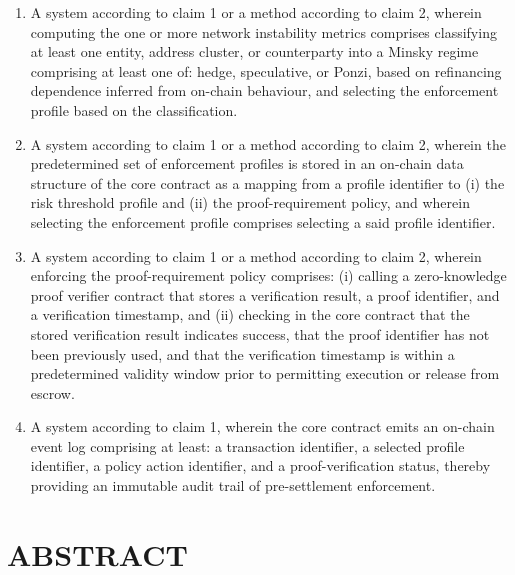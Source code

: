 \documentclass[12pt,a4paper]{article}
\begin{document}
\begin{enumerate}[label=\textbf{\arabic*.}]
\item A system according to claim 1 or a method according to claim 2,
wherein computing the one or more network instability metrics comprises
classifying at least one entity, address cluster, or counterparty into a
Minsky regime comprising at least one of: hedge, speculative, or Ponzi,
based on refinancing dependence inferred from on-chain behaviour, and
selecting the enforcement profile based on the classification.

\item A system according to claim 1 or a method according to claim 2,
wherein the predetermined set of enforcement profiles is stored in an
on-chain data structure of the core contract as a mapping from a profile
identifier to (i) the risk threshold profile and (ii) the proof-requirement
policy, and wherein selecting the enforcement profile comprises selecting a
said profile identifier.

\item A system according to claim 1 or a method according to claim 2,
wherein enforcing the proof-requirement policy comprises: (i) calling a
zero-knowledge proof verifier contract that stores a verification result, a
proof identifier, and a verification timestamp, and (ii) checking in the core
contract that the stored verification result indicates success, that the
proof identifier has not been previously used, and that the verification
timestamp is within a predetermined validity window prior to permitting
execution or release from escrow.

\item A system according to claim 1, wherein the core contract emits an
on-chain event log comprising at least: a transaction identifier, a selected
profile identifier, a policy action identifier, and a proof-verification
status, thereby providing an immutable audit trail of pre-settlement
enforcement.

\end{enumerate}

\newpage
\section*{ABSTRACT}
\end{document}

